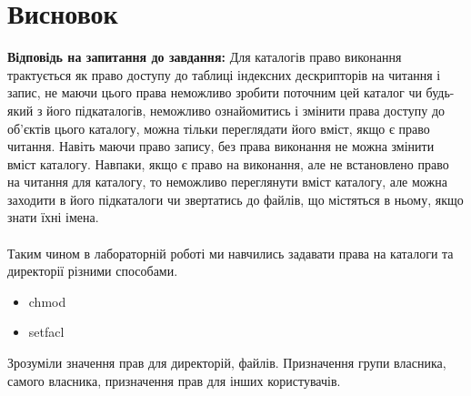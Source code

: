 \documentclass{article}
\begin{document}
\section*{Висновок}
\large
\textbf{Відповідь на запитання до завдання:} Для каталогів право виконання трактується як право доступу до таблиці індексних дескрипторів на читання і запис, не маючи цього права
неможливо зробити поточним цей каталог чи будь-який з його підкаталогів,
неможливо ознайомитись і змінити права доступу до об’єктів цього каталогу,
можна тільки переглядати його вміст, якщо є право читання. Навіть маючи
право запису, без права виконання не можна змінити вміст каталогу.
Навпаки, якщо є право на виконання, але не встановлено право на читання
для каталогу, то неможливо переглянути вміст каталогу, але можна заходити
в його підкаталоги чи звертатись до файлів, що містяться в ньому, якщо
знати їхні імена.
\\\\
\indent Таким чином в лабораторній роботі ми навчились задавати права на каталоги та директорії різними способами. 
\begin{itemize}
	\item chmod
	\item setfacl
\end{itemize}
Зрозуміли значення прав для директорій, файлів. Призначення групи власника, самого власника, призначення прав для інших користувачів.	
 
\end{document}
